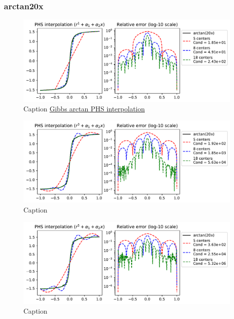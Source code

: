 \documentclass[12pt]{report} %
\begin{document}
\subsubsection{arctan20x}
\begin{figure}[ht]
    \centering
    \includegraphics[width=\textwidth]{imagenes/phs_interpolation/arctan20x_r1_deg1.pdf}
    \caption{Caption \href{https://github.com/heqro/tfm-experiments/blob/main/introductory_notebooks/rbf_interpolation/gibbs.ipynb}{Gibbs arctan PHS interpolation}}
    \label{fig:arctan20x-r1-deg1}
\end{figure}

\begin{figure}[ht]
    \centering
    \includegraphics[width=\textwidth]{imagenes/phs_interpolation/arctan20x_r3_deg1.pdf}
    \caption{Caption}
    \label{fig:arctan20x-r3-deg1}
\end{figure}

\begin{figure}[ht]
    \centering
    \includegraphics[width=\textwidth]{imagenes/phs_interpolation/arctan20x_r5_deg1.pdf}
    \caption{Caption}
    \label{fig:arctan20x-r5-deg1}
\end{figure}
\end{document}
